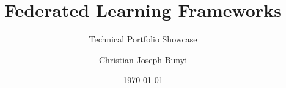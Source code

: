 \documentclass[10pt, aspectratio=169]{beamer}
\title{Federated Learning Frameworks}
\subtitle{Technical Portfolio Showcase}
\author{Christian Joseph Bunyi}
\institute{BS Computer Science}
\date{\today}
\begin{document}
\begin{frame}[plain]
    \titlepage
\end{frame}






\end{document}
